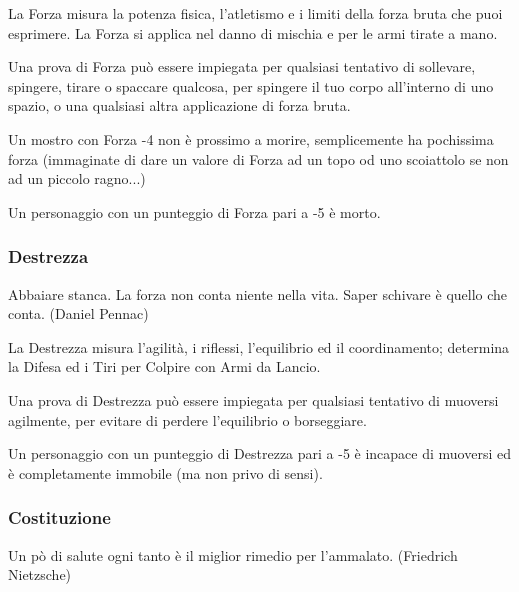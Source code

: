 \begin{multicols}{2}
La Forza misura la potenza fisica, l'atletismo e i limiti della forza bruta che puoi esprimere. La Forza si applica nel danno di mischia e per le armi tirate a mano.

Una prova di Forza può essere impiegata per qualsiasi tentativo di sollevare, spingere, tirare o spaccare qualcosa, per spingere il tuo corpo all'interno di uno spazio, o una qualsiasi altra applicazione di forza bruta.

Un mostro con Forza -4 non è prossimo a morire, semplicemente ha pochissima forza (immaginate di dare un valore di Forza ad un topo od uno scoiattolo se non ad un piccolo ragno...)

Un personaggio con un punteggio di Forza pari a -5 è morto.

\subsubsection{Destrezza}\label{destrezza}

\begin{changemargin}{0.3cm}{0.3cm}\begin{enfasi}{
Abbaiare stanca. La forza non conta niente nella vita. Saper schivare è quello che conta. (Daniel Pennac)
}\end{enfasi}\end{changemargin}

La Destrezza misura l'agilità, i riflessi, l'equilibrio ed il coordinamento; determina la Difesa ed i Tiri per Colpire con Armi da Lancio.

Una prova di Destrezza può essere impiegata per qualsiasi tentativo di muoversi agilmente, per evitare di perdere l'equilibrio o borseggiare.

Un personaggio con un punteggio di Destrezza pari a -5 è incapace di muoversi ed è completamente immobile (ma non privo di sensi).

\subsubsection{Costituzione}\label{costituzione}

\begin{changemargin}{0.3cm}{0.3cm}\begin{enfasi}{
Un pò di salute ogni tanto è il miglior rimedio per l'ammalato. (Friedrich Nietzsche)
}\end{enfasi}\end{changemargin}


\end{multicols}
